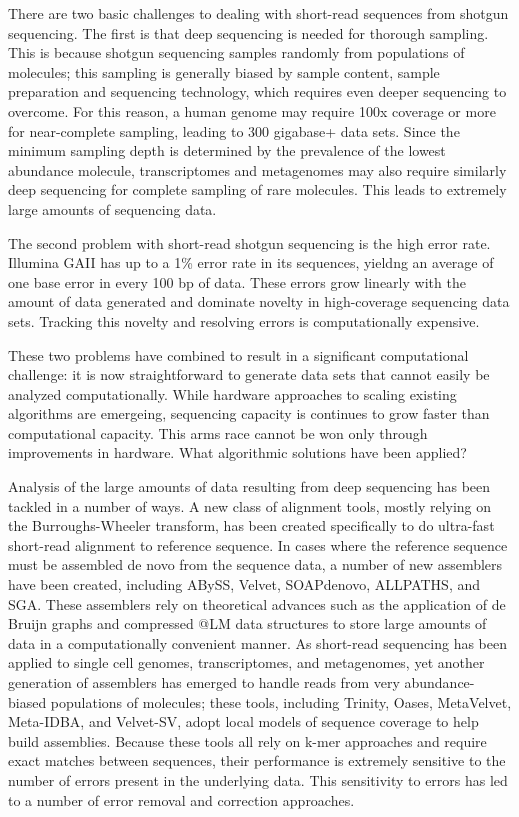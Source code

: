 \documentclass[10pt]{article}
\begin{document}
There are two basic challenges to dealing with short-read sequences
from shotgun sequencing. The first is that deep sequencing is needed
for thorough sampling. This is because shotgun sequencing samples
randomly from populations of molecules; this sampling is
generally biased by sample content,
sample preparation and sequencing technology, which requires even deeper
sequencing to overcome.  For this reason, a
human genome may require 100x coverage or more for near-complete
sampling, leading to 300 gigabase+ data sets.  Since the minimum sampling depth
is determined by the prevalence of the lowest abundance molecule, transcriptomes and
metagenomes may also require similarly deep sequencing for complete
sampling of rare molecules. This leads to extremely large amounts of
sequencing data.

The second problem with short-read shotgun sequencing is the high
error rate.  Illumina GAII has up to a 1\% error rate in its
sequences, yieldng an average of one base error in every 100 bp of
data.  These errors grow linearly with the amount of data generated and
dominate novelty in high-coverage sequencing data sets.  Tracking this
novelty and resolving errors is computationally expensive.

These two problems have combined to result in a significant
computational challenge: it is now straightforward to generate data
sets that cannot easily be analyzed computationally.  While hardware approaches
to scaling existing algorithms are emergeing, sequencing capacity
is continues to grow faster than computational capacity.
This arms race cannot be won only through improvements
in hardware.  What algorithmic solutions have been applied?

Analysis of the large amounts of data resulting from deep sequencing
has been tackled in a number of ways.  A new class of alignment tools,
mostly relying on the Burroughs-Wheeler transform, has been created
specifically to do ultra-fast short-read alignment to reference
sequence.  In cases where the reference sequence must be assembled de
novo from the sequence data, a number of new assemblers have been
created, including ABySS, Velvet, SOAPdenovo, ALLPATHS, and SGA.
These assemblers rely on theoretical advances such as the application
of de Bruijn graphs and compressed @LM data structures to store large
amounts of data in a computationally convenient manner.  As short-read
sequencing has been applied to single cell genomes, transcriptomes,
and metagenomes, yet another generation of assemblers has emerged to
handle reads from very abundance-biased populations of molecules;
these tools, including Trinity, Oases, MetaVelvet, Meta-IDBA, and
Velvet-SV, adopt local models of sequence coverage to help build
assemblies.  Because these tools all rely on k-mer approaches and
require exact matches between sequences, their performance is
extremely sensitive to the number of errors present in the underlying
data.  This sensitivity to errors has led to a number of error removal
and correction approaches.
\end{document}
